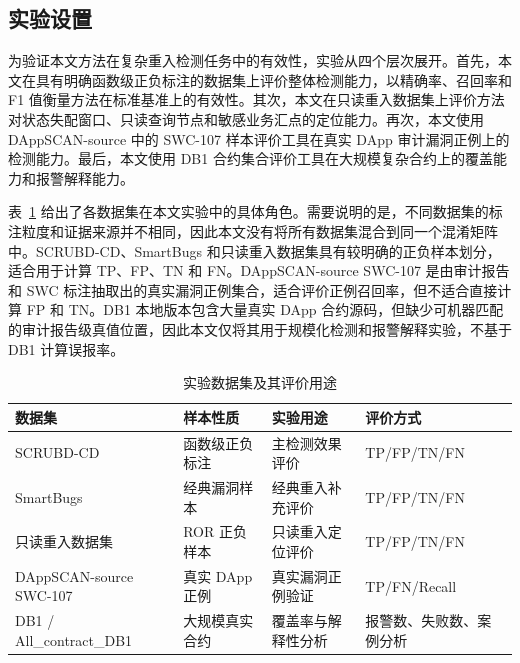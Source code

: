 

\subsection{实验设置}

为验证本文方法在复杂重入检测任务中的有效性，实验从四个层次展开。首先，本文在具有明确函数级正负标注的数据集上评价整体检测能力，以精确率、召回率和 F1 值衡量方法在标准基准上的有效性。其次，本文在只读重入数据集上评价方法对状态失配窗口、只读查询节点和敏感业务汇点的定位能力。再次，本文使用 DAppSCAN-source 中的 SWC-107 样本评价工具在真实 DApp 审计漏洞正例上的检测能力。最后，本文使用 DB1 合约集合评价工具在大规模复杂合约上的覆盖能力和报警解释能力。

表~\ref{tab:dataset-roles} 给出了各数据集在本文实验中的具体角色。需要说明的是，不同数据集的标注粒度和证据来源并不相同，因此本文没有将所有数据集混合到同一个混淆矩阵中。SCRUBD-CD、SmartBugs 和只读重入数据集具有较明确的正负样本划分，适合用于计算 TP、FP、TN 和 FN。DAppSCAN-source SWC-107 是由审计报告和 SWC 标注抽取出的真实漏洞正例集合，适合评价正例召回率，但不适合直接计算 FP 和 TN。DB1 本地版本包含大量真实 DApp 合约源码，但缺少可机器匹配的审计报告级真值位置，因此本文仅将其用于规模化检测和报警解释实验，不基于 DB1 计算误报率。

\begin{table}[htbp]
\centering
\caption{实验数据集及其评价用途}
\label{tab:dataset-roles}
\begin{tabular}{llll}
\toprule
数据集 & 样本性质 & 实验用途 & 评价方式 \\
\midrule
SCRUBD-CD & 函数级正负标注 & 主检测效果评价 & TP/FP/TN/FN \\
SmartBugs & 经典漏洞样本 & 经典重入补充评价 & TP/FP/TN/FN \\
只读重入数据集 & ROR 正负样本 & 只读重入定位评价 & TP/FP/TN/FN \\
DAppSCAN-source SWC-107 & 真实 DApp 正例 & 真实漏洞正例验证 & TP/FN/Recall \\
DB1 / All\_contract\_DB1 & 大规模真实合约 & 覆盖率与解释性分析 & 报警数、失败数、案例分析 \\
\bottomrule
\end{tabular}
\end{table}

